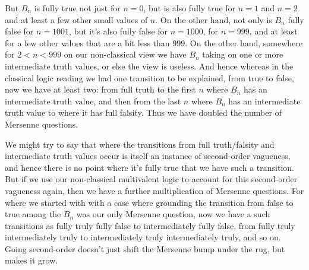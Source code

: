 But $B_n$ is fully true not just for $n=0$, but is also fully true for $n=1$ and $n=2$ and at least a few other small
values of $n$. On the other hand, not only is $B_n$ fully false for $n=1001$, but it's also fully false for
$n=1000$, for $n=999$, and at least for a few other values that are a bit less than $999$. On the other hand, somewhere 
for $2<n<999$ on our non-classical view we have $B_n$ taking on one or more intermediate truth values, or else the
view is useless. And hence whereas in the classical logic reading we had one transition to be explained, from true to false, now we have at least two: from full truth to the first $n$ where $B_n$ has an intermediate truth value, and
then from the last $n$ where $B_n$ has an intermediate truth value to where it has full falsity.
Thus we have doubled 
the number of Mersenne questions. 

We might try to say that where the transitions from full truth/falsity and intermediate truth values occur 
is itself an instance of second-order vagueness, and hence there is no point where it's fully true that we have
such a transition. But if we use our non-classical multivalent logic to account for this second-order vagueness
again, then we have a further multiplication of Mersenne questions. For where we started with with a case where
grounding the transition from false to true among the $B_n$ was our only Mersenne question, now we have a
such transitions as fully truly fully false to intermediately fully false, from fully truly intermediately
truly to intermediately truly intermediately truly, and so on. Going second-order doesn't just shift the 
Mersenne bump under the rug, but makes it grow.

